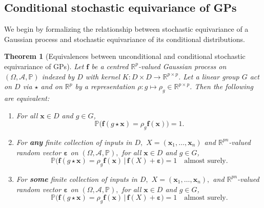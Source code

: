 \documentclass[11pt,a4paper]{article}
\newcommand{\R}{\mathbb{R}}
\newcommand{\bff}{\boldsymbol{f}}
\newcommand{\bx}{\boldsymbol{x}}
\newtheorem{thm}{Theorem}[section]
\begin{document}
\subsection{Conditional stochastic equivariance of GPs}
We begin by formalizing the relationship between stochastic equivariance of a Gaussian process and stochastic equivariance of its conditional distributions. 

\begin{thm}[Equivalences between unconditional and conditional stochastic equivariance of GPs]\label{thm:equivariant-conditioning}
Let $\bff$ be a centred $\mathbb{R}^{p}$-valued Gaussian process on $(\Omega, \mathcal{A}, \mathbb{P})$ indexed by $D$ with kernel $K \colon D \times D \to \R^{p \times p}$. Let a linear group $G$ act on $D$ via $\star$ and on $\R^{p}$ by a representation $\rho \colon g \mapsto \rho_{g} \in \R^{p \times p}$.
Then the following are equivalent:
\begin{enumerate}[label=(\roman*)]
    \item For all
    $\bx \in D$ and $g \in G$,
    \begin{equation*}\mathbb{P}\big(\bff(g \star \bx) = \rho_{g} \bff(\bx)\big) = 1.\end{equation*}
    \item For \textbf{any} finite collection of inputs in $D,$ $X = \left(\bx_{1},\dots,\bx_{n}\right)$ and $\R^{pn}$-valued random vector $\boldsymbol{\varepsilon}$ on $(\Omega, \mathcal{A}, \mathbb{P}),$ for all $\bx \in D$ and $g \in G$,
    \begin{equation*}\mathbb{P}\big(\bff(g \star \bx) = \rho_{g} \bff(\bx) \,\big|\, \bff(X)+\boldsymbol{\varepsilon}\big)= 1 \quad \text{almost surely.}\end{equation*}
    \item For \textbf{some} finite collection of inputs in $D,$ $X = \left(\bx_{1},\dots,\bx_{n}\right),$ and $\R^{pn}$-valued random vector $\boldsymbol{\varepsilon}$ on $(\Omega, \mathcal{A}, \mathbb{P}),$ for all $\bx \in D$ and $g \in G$,
    \begin{equation*}\mathbb{P}\big(\bff(g \star \bx) = \rho_{g} \bff(\bx) \,\big|\, \bff(X)+\boldsymbol{\varepsilon}\big)= 1 \quad \text{almost surely.}\end{equation*}
\end{enumerate}
\end{thm}
\end{document}
